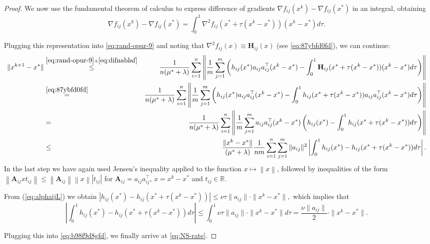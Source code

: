 \documentclass[12pt]{article}
\newcommand{\R}{\mathbb{R}}
\newcommand{\norm}[1]{\left\|#1\right\|}
\newcommand{\newalpha}{h}
\newcommand{\mA}{\mathbf{A}}
\newcommand{\mH}{\mathbf{H}}
\begin{document}
\begin{proof}
{We now use the fundamental theorem of calculus to express difference of gradients $\nabla f_{ij}(x^k) - \nabla f_{ij}(x^*)$ in an integral, obtaining
\begin{equation}\label{eq:difnablaf}
\nabla f_{ij}(x^k) - \nabla f_{ij}(x^*) = \int_{0}^1 \nabla^2 f_{ij}(x^* + \tau (x^k-x^*)) (x^k-x^*) d\tau. 
\end{equation}

Plugging this representation into	\eqref{eq:rand-opur-9} and noting that $ \nabla^2 f_{ij}(x)\equiv \mH_{ij}(x)$ (see \eqref{eq:87ybfd0fd}), we can continue:
\begin{eqnarray}	
	\|x^{k+1} - x^*\| 	& \overset{\eqref{eq:rand-opur-9}+\eqref{eq:difnablaf}}{ \leq} & \frac{1}{n (\mu^*+\lambda)} \sum_{i=1}^n \left\|   \frac{1}{m}  \sum_{j=1}^{m} \left(  \newalpha_{ij}(x^*) a_{ij}a_{ij}^\top (x^k - x^*) -  \int_{0}^1 \mH_{ij} (x^* + \tau(x^k - x^*)) (x^k - x^*)d\tau  \right)   \right\|  \notag \\ 
	&\overset{\eqref{eq:87ybfd0fd}}{=}& \frac{1}{n (\mu^*+\lambda)} \sum_{i=1}^n  \left\| \frac{1}{m} \sum_{j=1}^{m} \left(  \newalpha_{ij}(x^*) a_{ij}a_{ij}^\top (x^k - x^*)  -  \int_{0}^1 \newalpha_{ij} (x^* + \tau(x^k - x^*))a_{ij}a_{ij}^\top (x^k - x^*)d\tau  \right)   \right\| \notag  \\ 
	&=& \frac{1}{n (\mu^*+\lambda)} \sum_{i=1}^n  \left\| \frac{1}{m} \sum_{j=1}^{m}  a_{ij}a_{ij}^\top (x^k - x^*) \left( \newalpha_{ij}(x^*) - \int_{0}^1 \newalpha_{ij}(x^* + \tau(x^k - x^*))  d\tau \right) \right\|  \notag \\ 
	&\leq& \frac{ \|x^k - x^*\|}{ (\mu^*+\lambda)} \frac{1}{nm}\sum_{i=1}^n \sum_{j=1}^{m} \|a_{ij}\|^2 \left|   \int_{0}^1  \newalpha_{ij}(x^*) - \newalpha_{ij}(x^* + \tau(x^k - x^*))  d\tau  \right|. \label{eq:b98f9d8gfd}
\end{eqnarray}
In the last step we have again used Jensen's inequality applied to the function $x\mapsto \norm{x}$, followed by  inequalities of the form $\norm{\mA_{ij} x t_{ij}} \leq \norm{\mA_{ij}} \norm{x} |t_{ij}|$ for $\mA_{ij} = a_{ij}a_{ij}^\top $, $x=x^k-x^*$ and $t_{ij}\in \R$.

From (\ref{eq:alphaijL})  we obtain
$
| \newalpha_{ij}(x^*) - \newalpha_{ij}(x^* + \tau(x^k - x^*))| \leq \nu \tau \|a_{ij}\| \cdot \|x^k - x^*\|, 
$
which implies that 
$$
\left|   \int_{0}^1  \newalpha_{ij}(x^*) - \newalpha_{ij}(x^* + \tau(x^k - x^*))  d\tau  \right| \leq \int_{0}^1 \nu \tau \|a_{ij}\| \cdot \|x^k - x^*\| d\tau = \frac{\nu \|a_{ij}\|}{2} \cdot \|x^k - x^*\|. 
$$

Plugging this into \eqref{eq:b98f9d8gfd}, we finally arrive at \eqref{eq:NS-rate}.
}
\end{proof}
\end{document}
